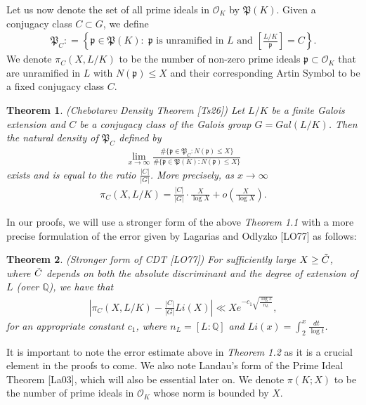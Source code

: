 \documentclass[12pt]{article}
\numberwithin{equation}{section}
\newtheorem{theorem}{Theorem}[section]
\numberwithin{equation}{section}
\begin{document}
Let us now denote the set of all prime ideals in $\mathcal{O}_K$ by $\mathfrak{P}(K)$. Given a conjugacy class $C \subset G$, we define
\begin{align}
    \mathfrak{P}_C : = \left\{\mathfrak{p} \in \mathfrak{P}(K):\;\mathfrak{p} \text{ is unramified in $L$ and } \left[\frac{L/K}{\mathfrak{p}}\right]=C \right\}. \nonumber
\end{align}
We denote $\pi_C(X,L/K)$ to be the number of non-zero prime ideals $\mathfrak{p} \subset \mathcal{O}_K$ that are unramified in $L$ with $N(\mathfrak{p}) \leq X$ and their corresponding Artin Symbol to be a fixed conjugacy class $C$.
\begin{theorem}{(Chebotarev Density Theorem [Ts26])}
    Let $L/K$ be a finite Galois extension and $C$ be a conjugacy class of the Galois group $G=Gal(L/K)$. Then the natural density of $\mathfrak{P}_C$ defined by 
    \begin{align}
        \lim_{x\to \infty} \frac{\#\{\mathfrak{p} \in \mathfrak{P}_C:N(\mathfrak{p}) \leq X\}}{\#\{\mathfrak{p} \in \mathfrak{P}(K): N(\mathfrak{p}) \leq X\}} \nonumber
    \end{align}
    exists and is equal to the ratio $\frac{|C|}{|G|}$. More precisely, as $x \to \infty$
    \begin{align}
        \pi_C(X,L/K) = \frac{|C|}{|G|}\cdot \frac{X}{\log X}+o\left(\frac{X}{\log X}\right). \nonumber
    \end{align}
\end{theorem}
\noindent In our proofs, we will use a stronger form of the above \textit{Theorem 1.1} with a more precise formulation of the error given by Lagarias and Odlyzko [LO77] as follows:
\begin{theorem}
    (Stronger form of CDT [LO77]) For sufficiently large $X \geq \Tilde{C}$, where $\Tilde{C}$ depends on both the absolute discriminant and the degree of extension of $L$ (over $\mathbb{Q}$), we have that 
    \begin{align}
        \left|\pi_C(X,L/K)-\frac{|C|}{|G|}Li(X)\right| \ll Xe^{-c_1\sqrt{\frac{\log x}{n_L}}}, \nonumber
    \end{align}
    for an appropriate constant $c_1$, where $n_L=[L:\mathbb{Q}]$ and $Li(x) = \int_2^x\frac{dt}{\log t}$.
\end{theorem}
\noindent It is important to note the error estimate above in \textit{Theorem 1.2} as it is a crucial element in the proofs to come. We also note Landau's form of the Prime Ideal Theorem [La03], which will also be essential later on. We denote $\pi(K;X)$ to be the number of prime ideals in $\mathcal{O}_K$ whose norm is bounded by $X$. 
\end{document}
